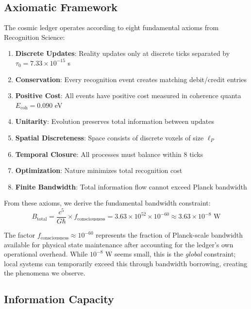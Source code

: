 \documentclass[twocolumn,prd,amsmath,amssymb,aps,superscriptaddress,nofootinbib]{revtex4-2}
\begin{document}
\subsection{Axiomatic Framework}

The cosmic ledger operates according to eight fundamental axioms from Recognition Science:

\begin{enumerate}
\item \textbf{Discrete Updates}: Reality updates only at discrete ticks separated by $\tau_0 = 7.33 \times 10^{-15}$ s
\item \textbf{Conservation}: Every recognition event creates matching debit/credit entries  
\item \textbf{Positive Cost}: All events have positive cost measured in coherence quanta $E_{\text{coh}} = 0.090$ eV
\item \textbf{Unitarity}: Evolution preserves total information between updates
\item \textbf{Spatial Discreteness}: Space consists of discrete voxels of size $\ell_P$
\item \textbf{Temporal Closure}: All processes must balance within 8 ticks
\item \textbf{Optimization}: Nature minimizes total recognition cost
\item \textbf{Finite Bandwidth}: Total information flow cannot exceed Planck bandwidth
\end{enumerate}

From these axioms, we derive the fundamental bandwidth constraint:
\begin{equation}
B_{\text{total}} = \frac{c^5}{G\hbar} \times f_{\text{consciousness}} = 3.63 \times 10^{52} \times 10^{-60} \approx 3.63 \times 10^{-8} \text{ W}
\label{eq:btotal}
\end{equation}

The factor $f_{\text{consciousness}} \approx 10^{-60}$ represents the fraction of Planck-scale bandwidth available for physical state maintenance after accounting for the ledger's own operational overhead. While $10^{-8}$ W seems small, this is the \emph{global} constraint; local systems can temporarily exceed this through bandwidth borrowing, creating the phenomena we observe.

\subsection{Information Capacity}
\end{document}
